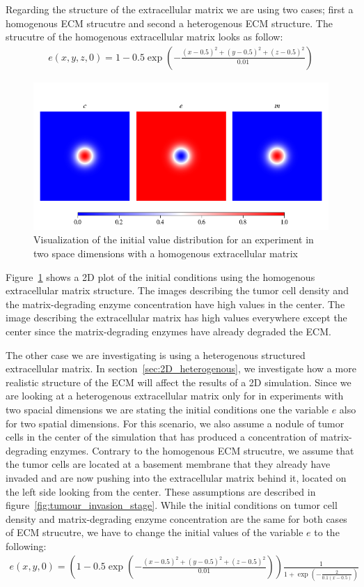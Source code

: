 Regarding the structure of the extracellular matrix we are using two cases; first a homogenous ECM strucutre and second a heterogenous ECM structure.
The strucutre of the homogenous extracellular matrix looks as follow:
\begin{align*}
    e(x,y,z,0) = 1 - 0.5 \exp(-\frac{(x-0.5)^2+(y-0.5)^2+(z-0.5)^2}{0.01})
\end{align*}

\begin{figure}[ht!]
    \centering
    \includegraphics[width=\textwidth]{resources/images/2D_initial_conditions_homogenous_ECM.png}
    \caption{Visualization of the initial value distribution for an experiment in two space dimensions with a homogenous extracellular matrix}
    \label{fig:2D_homogenous_ECM_initial}
\end{figure}
Figure~\ref{fig:2D_homogenous_ECM_initial} shows a 2D plot of the initial conditions using the homogenous extracellular matrix structure. The images describing the tumor cell density and the matrix-degrading enzyme concentration have high values in the center. The image describing the extracellular matrix has high values everywhere except the center since the matrix-degrading enzymes have already degraded the ECM.


The other case we are investigating is using a heterogenous structured extracellular matrix. In section~\ref{sec:2D_heterogenous}, we investigate how a more realistic structure of the ECM will affect the results of a 2D simulation. Since we are looking at a heterogenous extracellular matrix only for in experiments with two spacial dimensions we are stating the initial conditions one the variable $e$ also for two spatial dimensions. For this scenario, we also assume a nodule of tumor cells in the center of the simulation that has produced a concentration of matrix-degrading enzymes. Contrary to the homogenous ECM strucutre, we assume that the tumor cells are located at a basement membrane that they already have invaded and are now pushing into the extracellular matrix behind it, located on the left side looking from the center. These assumptions are described in figure~\ref{fig:tumour_invasion_stage}. While the initial conditions on tumor cell density and matrix-degrading enzyme concentration are the same for both cases of ECM strucutre, we have to change the initial values of the variable $e$ to the following:
\begin{align*}
    e(x,y,0) = (1 - 0.5 \exp(-\frac{(x-0.5)^2+(y-0.5)^2+(z-0.5)^2}{0.01}))\frac{1}{1+\exp(-\frac{2}{0.1 (x-0.5)})}
\end{align*}

